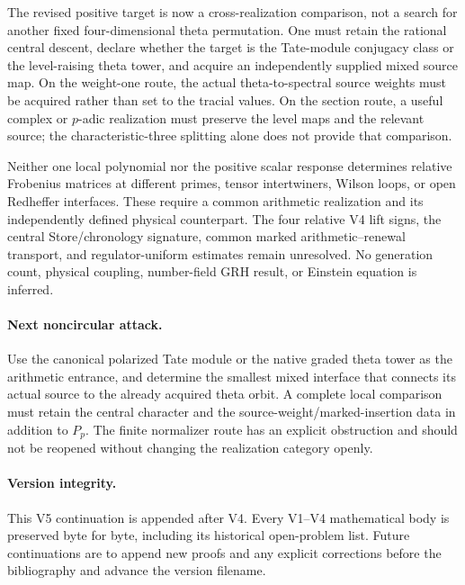 \documentclass[11pt]{article}
\theoremstyle{definition}
\theoremstyle{remark}
\begin{document}
The revised positive target is now a cross-realization comparison, not a
search for another fixed four-dimensional theta permutation. One must
retain the rational central descent, declare whether the target is the
Tate-module conjugacy class or the level-raising theta tower, and acquire
an independently supplied mixed source map. On the weight-one route,
the actual theta-to-spectral source weights must be acquired rather than
set to the tracial values. On the section route, a useful complex or
$p$-adic realization must preserve the level maps and the relevant source;
the characteristic-three splitting alone does not provide that comparison.

Neither one local polynomial nor the positive scalar response determines
relative Frobenius matrices at different primes, tensor intertwiners,
Wilson loops, or open Redheffer interfaces. These require a common
arithmetic realization and its independently defined physical counterpart.
The four relative V4 lift signs, the central Store/chronology signature,
common marked arithmetic--renewal transport, and regulator-uniform
estimates remain unresolved. No generation count, physical coupling,
number-field GRH result, or Einstein equation is inferred.

\paragraph{Next noncircular attack.}
Use the canonical polarized Tate module or the native graded theta tower
as the arithmetic entrance, and determine the smallest mixed interface
that connects its actual source to the already acquired theta orbit.
A complete local comparison must retain the central character and the
source-weight/marked-insertion data in addition to $P_p$. The finite
normalizer route has an explicit obstruction and should not be reopened
without changing the realization category openly.

\paragraph{Version integrity.}
This V5 continuation is appended after V4. Every V1--V4 mathematical body
is preserved byte for byte, including its historical open-problem list.
Future continuations are to append new proofs and any explicit corrections
before the bibliography and advance the version filename.
\clearpage
\end{document}
